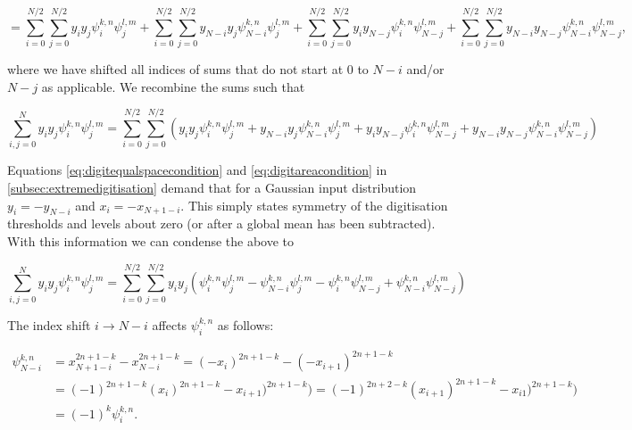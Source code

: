 \documentclass[apj]{emulateapj}
\begin{document}
\begin{equation}
 = \sum_{i = 0}^{N/2}\sum_{j = 0}^{N/2} y_i y_j \psi_i^{k, n} \psi_j^{l, m} + \sum_{i = 0}^{N/2}\sum_{j = 0}^{N/2} y_{N-i} y_j \psi_{N-i}^{k, n} \psi_j^{l, m} + \sum_{i = 0}^{N/2}\sum_{j = 0}^{N/2} y_i y_{N-j} \psi_i^{k, n} \psi_{N-j}^{l, m} + \sum_{i = 0}^{N/2}\sum_{j = 0}^{N/2} y_{N-i} y_{N-j} \psi_{N-i}^{k, n} \psi_{N-j}^{l, m},
\end{equation}

where we have shifted all indices of sums that do not start at $0$ to $N-i$ and/or $N-j$ as applicable. We recombine the sums such that

\begin{equation}
\sum_{i,j = 0}^N y_i y_j \psi_i^{k, n} \psi_j^{l, m} = \sum_{i = 0}^{N/2}\sum_{j = 0}^{N/2} \left( y_i y_j \psi_i^{k, n} \psi_j^{l, m} +  y_{N-i} y_j \psi_{N-i}^{k, n} \psi_j^{l, m} + y_i y_{N-j} \psi_i^{k, n} \psi_{N-j}^{l, m} + y_{N-i} y_{N-j} \psi_{N-i}^{k, n} \psi_{N-j}^{l, m} \right)
\end{equation}

Equations \ref{eq:digitequalspacecondition} and \ref{eq:digitareacondition} in \ref{subsec:extremedigitisation} demand that for a Gaussian input distribution $y_i = -y_{N-i}$ and $x_i = -x_{N+1-i}$. This simply states symmetry of the digitisation thresholds and levels about zero (or after a global mean has been subtracted). With this information we can condense the above to

\begin{equation} \label{eq:ijsum}
\sum_{i,j = 0}^N y_i y_j \psi_i^{k, n} \psi_j^{l, m} = \sum_{i = 0}^{N/2}\sum_{j = 0}^{N/2} y_i y_j \left( \psi_i^{k, n} \psi_j^{l, m} - \psi_{N-i}^{k, n} \psi_j^{l, m} - \psi_i^{k, n} \psi_{N-j}^{l, m} + \psi_{N-i}^{k, n} \psi_{N-j}^{l, m} \right)
\end{equation}

The index shift $i \to N-i$ affects $\psi_{i}^{k, n}$ as follows:

\begin{equation}
\begin{aligned}
\psi_{N-i}^{k,n} &= x_{N+1-i}^{2n+1-k} - x_{N-i}^{2n+1-k} = (-x_{i})^{2n+1-k} - (-x_{i+1})^{2n+1-k}\\
&= (-1)^{2n+1-k} (x_{i})^{2n+1-k} - x_{i+1})^{2n+1-k} ) = (-1)^{2n+2-k} (x_{i+1})^{2n+1-k} - x_{i1})^{2n+1-k} )\\
&= (-1)^{k} \psi_{i}^{k,n}.
\end{aligned}
\end{equation}
\end{document}
